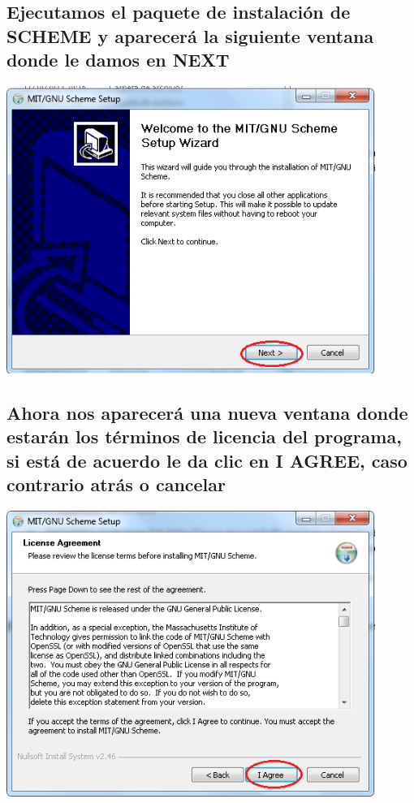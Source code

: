 \documentclass[11pt]{article} %
\begin{document}
\subsection{Ejecutamos el paquete de instalación de SCHEME y aparecerá la siguiente ventana donde le damos en NEXT}
\begin{center}
\includegraphics[width=12cm]{2.png}
\end{center}

\subsection{Ahora nos aparecerá una nueva ventana donde estarán los términos de licencia del programa, si está de acuerdo le da clic en  I AGREE, caso contrario atrás o cancelar}
\begin{center}
\includegraphics[width=12cm]{3.png}
\end{center}
\end{document}
